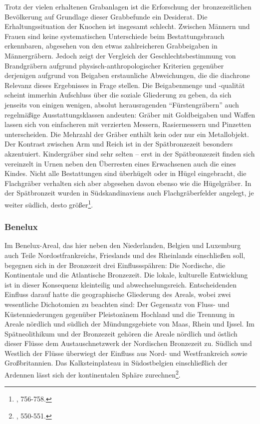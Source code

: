 \documentclass[openany,twoside,twocolumn]{book}
\let\rmarkdownfootnote\footnote%
\def\footnote{\protect\rmarkdownfootnote}
\begin{document}
Trotz der vielen erhaltenen Grabanlagen ist die Erforschung der
bronzezeitlichen Bevölkerung auf Grundlage dieser Grabbefunde ein
Desiderat. Die Erhaltungssituation der Knochen ist insgesamt schlecht.
Zwischen Männern und Frauen sind keine systematischen Unterschiede beim
Bestattungsbrauch erkennbaren, abgesehen von den etwas zahlreicheren
Grabbeigaben in Männergräbern. Jedoch zeigt der Vergleich der
Geschlechtsbestimmung von Brandgräbern aufgrund
physisch-anthropologischer Kriterien gegenüber derjenigen aufgrund von
Beigaben erstaunliche Abweichungen, die die diachrone Relevanz dieses
Ergebnisses in Frage stellen. Die Beigabenmenge und -qualität scheint
immerhin Aufschluss über die soziale Gliederung zu geben, da sich
jenseits von einigen wenigen, absolut herausragenden ``Fürstengräbern''
auch regelmäßige Ausstattungsklassen andeuten: Gräber mit Goldbeigaben
und Waffen lassen sich von einfacheren mit verzierten Messern,
Rasiermessern und Pinzetten unterscheiden. Die Mehrzahl der Gräber
enthält kein oder nur ein Metallobjekt. Der Kontrast zwischen Arm und
Reich ist in der Spätbronzezeit besonders akzentuiert. Kindergräber sind
sehr selten -- erst in der Spätbronzezeit finden sich vereinzelt in
Urnen neben den Überresten eines Erwachsenen auch die eines Kindes.
Nicht alle Bestattungen sind überhügelt oder in Hügel eingebracht, die
Flachgräber verhalten sich aber abgesehen davon ebenso wie die
Hügelgräber. In der Spätbronzeit wurden in Südskandinaviens auch
Flachgräberfelder angelegt, je weiter südlich, desto größer\footnote{\textcite{thrane_scandinavia_2013},
  756-758.}.

\hypertarget{benelux}{%
\subsubsection{Benelux}\label{benelux}}

Im Benelux-Areal, das hier neben den Niederlanden, Belgien und Luxemburg
auch Teile Nordostfrankreichs, Frieslands und des Rheinlands
einschließen soll, begegnen sich in der Bronzezeit drei Einflussspähren:
Die Nordische, die Kontinentale und die Atlantische Bronzezeit. Die
lokale, kulturelle Entwicklung ist in dieser Konsequenz kleinteilig und
abwechselungsreich. Entscheidenden Einfluss darauf hatte die
geographische Gliederung des Areals, wobei zwei wesentliche Dichotomien
zu beachten sind: Der Gegensatz von Fluss- und Küstenniederungen
gegenüber Pleistozänem Hochland und die Trennung in Areale nördlich und
südlich der Mündungsgebiete von Maas, Rhein und Ijssel. Im
Spätneolithikum und der Bronzezeit gehören die Areale nördlich und
östlich dieser Flüsse dem Austauschnetzwerk der Nordischen Bronzezeit
zu. Südlich und Westlich der Flüsse überwiegt der Einfluss aus Nord- und
Westfrankreich sowie Großbritannien. Das Kalksteinplateau in
Südostbelgien einschließlich der Ardennen lässt sich der kontinentalen
Sphäre zurechnen\footnote{\textcite{fokkens_bronze_2013}, 550-551.}.
\end{document}
